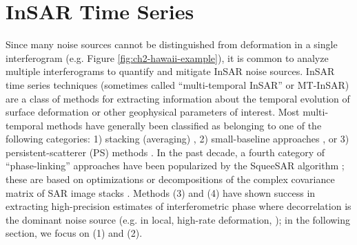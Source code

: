 

\section{InSAR Time Series}
\label{sec:ch2-insar-ts}

Since many noise sources cannot be distinguished from deformation in a single interferogram (e.g. Figure \ref{fig:ch2-hawaii-example}), it is common to analyze multiple interferograms to quantify and mitigate InSAR noise sources.
InSAR time series techniques (sometimes called ``multi-temporal InSAR'' or MT-InSAR) are a class of methods for extracting information about the temporal evolution of surface deformation or other geophysical parameters of interest.  Most multi-temporal methods have generally been classified as belonging to one of the following categories: 1) stacking (averaging) \citep{Zebker1997AtmosphericEffectsInterferometric, Sandwell1998PhaseGradientApproach}, 2) small-baseline approaches \citep{Berardino2002NewAlgorithmSurface}, or 3) persistent-scatterer (PS) methods \citep{Ferretti2001PermanentScatterersSar, Hooper2006PersistentScatterRadar}. In the past decade, a fourth category of ``phase-linking'' approaches have been popularized by the SqueeSAR algorithm \citep{Ferretti2011NewAlgorithmProcessing}; these are based on optimizations or decompositions of the complex covariance matrix of SAR image stacks \citep{Guarnieri2008ExploitationTargetStatistics, Fornaro2015CaesarApproachBased, Ansari2018EfficientHighPrecision}. Methods (3) and (4) have shown success in extracting high-precision estimates of interferometric phase where decorrelation is the dominant noise source (e.g. in local, high-rate deformation, \citep{Tebaldini2010MethodsPerformancesMulti}); in the following section, we focus on (1) and (2).


